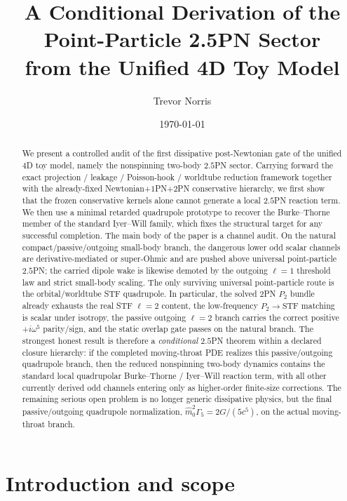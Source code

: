 \documentclass[11pt]{article}
\title{A Conditional Derivation of the Point-Particle 2.5PN Sector\\from the Unified 4D Toy Model}
\author{Trevor Norris}
\date{\today}
\begin{document}
\maketitle

\begin{abstract}
We present a controlled audit of the first dissipative post-Newtonian gate of the
unified $4$D toy model, namely the nonspinning two-body $2.5$PN sector.
Carrying forward the exact projection / leakage / Poisson-hook / worldtube
reduction framework together with the already-fixed Newtonian+$1$PN+$2$PN
conservative hierarchy, we first show that the frozen conservative kernels alone
cannot generate a local $2.5$PN reaction term.  We then use a minimal retarded
quadrupole prototype to recover the Burke--Thorne member of the standard
Iyer--Will family, which fixes the structural target for any successful
completion.  The main body of the paper is a channel audit.  On the natural
compact/passive/outgoing small-body branch, the dangerous lower odd scalar
channels are derivative-mediated or super-Ohmic and are pushed above universal
point-particle $2.5$PN; the carried dipole wake is likewise demoted by the
outgoing $\ell=1$ threshold law and strict small-body scaling.  The only
surviving universal point-particle route is the orbital/worldtube STF
quadrupole.  In particular, the solved $2$PN $P_2$ bundle already exhausts the
real STF $\ell=2$ content, the low-frequency $P_2\to\mathrm{STF}$ matching is
scalar under isotropy, the passive outgoing $\ell=2$ branch carries the correct
positive $+i\omega^5$ parity/sign, and the static overlap gate passes on the
natural branch.  The strongest honest result is therefore a \emph{conditional}
$2.5$PN theorem within a declared closure hierarchy: if the completed
moving-throat PDE realizes this passive/outgoing quadrupole branch, then the
reduced nonspinning two-body dynamics contains the standard local quadrupolar
Burke--Thorne / Iyer--Will reaction term, with all other currently derived odd
channels entering only as higher-order finite-size corrections.  The remaining
serious open problem is no longer generic dissipative physics, but the final
passive/outgoing quadrupole normalization,
\(\hat m_0^2\Gamma_5 = 2G/(5c^5)\), on the actual moving-throat branch.
\end{abstract}

\section{Introduction and scope}
\label{sec:intro}
\end{document}
